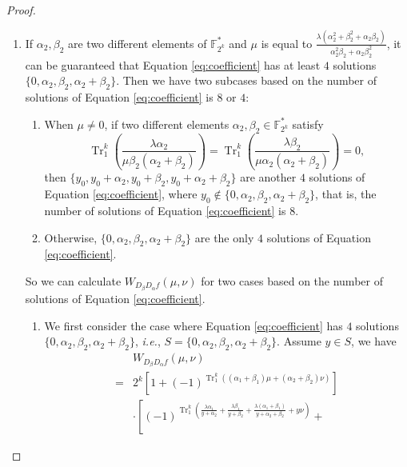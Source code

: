 \documentclass{article}
\newcommand{\F}{\mathbb{F}}
\newcommand{\0}{\textbf{0}}
\newcommand{\1}{\textbf{1}}
\newcommand{\TRACE}{\operatorname{Tr}_1^k}
\theoremstyle{plain}
\begin{document}
\begin{proof}
\begin{enumerate}[label=\textbf{Case \arabic*},wide = 0pt]
            \item If $\alpha_2,\beta_2$ are two different elements of $\F_{2^k}^*$ and $\mu$ is equal to $\frac{\lambda(\alpha_2^2+\beta_2^2+\alpha_2\beta_2)}{\alpha_2^2\beta_2+\alpha_2\beta_2^2}$,
            it can be guaranteed that Equation \eqref{eq:coefficient} has at least $4$ solutions $\{0,\alpha_2,\beta_2,\alpha_2+\beta_2\}$. 
            Then we have two subcases based on the number of solutions of Equation \eqref{eq:coefficient} is $8$ or $4$:
            \begin{enumerate}[label=(\arabic{*})]
                \item When $\mu\ne 0$, if two different elements $\alpha_2,\beta_2\in\F_{2^k}^*$ satisfy
                \begin{equation}\label{eq:last_four_solution_condition}
                    \TRACE\left(\frac{\lambda\alpha_2}{\mu\beta_2(\alpha_2+\beta_2)}\right)=\TRACE\left(\frac{\lambda\beta_2}{\mu\alpha_2(\alpha_2+\beta_2)}\right)=0,
                \end{equation}
                then $\{y_0,y_0+\alpha_2,y_0+\beta_2,y_0+\alpha_2+\beta_2\}$ are another $4$ solutions of Equation \eqref{eq:coefficient}, where $y_0\notin\{0,\alpha_2,\beta_2,\alpha_2+\beta_2\}$, that is, the number of solutions of Equation \eqref{eq:coefficient} is $8$.
                \item Otherwise, $\{0,\alpha_2,\beta_2,\alpha_2+\beta_2\}$ are the only $4$ solutions of Equation \eqref{eq:coefficient}.
            \end{enumerate}
            So we can calculate $W_{D_{\beta}D_{\alpha}f}(\mu,\nu)$ for two cases based on the number of solutions of Equation \eqref{eq:coefficient}.
            \begin{enumerate}[label=\textbf{Subcase \Alph{*}},itemindent=*,wide=\parindent]
                \item We first consider the case where Equation \eqref{eq:coefficient} has $4$ solutions
                $\{0,\alpha_2,\beta_2,\alpha_2+\beta_2\}$, \emph{i.e.}, $S=\{0,\alpha_2,\beta_2,\alpha_2+\beta_2\}$.
                Assume $y\in S$, we have
                \begin{align}\label{eq:simpleforms_4}
                    &W_{D_{\beta}D_{\alpha}f}(\mu,\nu)\nonumber\\
                    =&2^k\left[1+(-1)^{\TRACE\left((\alpha_1+\beta_1)\mu+ (\alpha_2+\beta_2)\nu\right)}\right]\nonumber\\
                    &\cdot
                    \left[(-1)^{\TRACE\left(\frac{\lambda\alpha_1}{y+\alpha_2}+\frac{\lambda\beta_1}{y+\beta_2}+\frac{\lambda(\alpha_1+\beta_1)}{y+\alpha_2+\beta_2}+ y\nu\right)}+

\end{align}
\end{enumerate}
\end{enumerate}
\end{proof}
\end{document}
